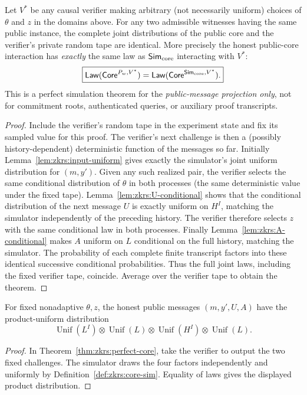 \begin{theorem}\label{thm:zkrs:perfect-core}
Let $V^*$ be any causal verifier making arbitrary (not necessarily
uniform) choices of $\theta$ and $z$ in the domains above.
For any two admissible witnesses having the same public instance,
the complete joint distributions of the public core and
the verifier's private random tape are identical.
More precisely the honest public-core interaction has
\emph{exactly} the same law as
$\mathsf{Sim}_{\rm core}$ interacting with $V^*$:
\[
 \boxed{
 \mathsf{Law}(\mathsf{Core}^{P_w,V^*})
 =\mathsf{Law}(\mathsf{Core}^{\mathsf{Sim}_{\rm core},V^*}).
 }
\]
This is a perfect simulation theorem for the \emph{public-message
projection only}, not for commitment roots, authenticated queries,
or auxiliary proof transcripts.
\end{theorem}
\begin{proof}
Include the verifier's random tape in the experiment state
and fix its sampled value for this proof.
The verifier's next challenge is then a (possibly
history-dependent) deterministic function of the messages so far.
Initially Lemma~\ref{lem:zkrs:input-uniform} gives exactly the
simulator's joint uniform distribution for $(m,y')$.
Given any such realized pair, the verifier selects the same
conditional distribution of $\theta$ in both processes
(the same deterministic value under the fixed tape).
Lemma~\ref{lem:zkrs:U-conditional} shows that the conditional
distribution of the next message $U$ is exactly uniform on $H^I$,
matching the simulator independently of the preceding history.
The verifier therefore selects $z$ with the same conditional
law in both processes. Finally
Lemma~\ref{lem:zkrs:A-conditional} makes $A$ uniform on $L$
conditional on the full history, matching the simulator.
The probability of each complete finite transcript factors into
these identical successive conditional probabilities.
Thus the full joint laws, including the fixed verifier tape,
coincide. Average over the verifier tape to obtain the theorem.
\end{proof}

\begin{corollary}\label{cor:zkrs:product}
For fixed nonadaptive $\theta,z$, the honest public messages
$(m,y',U,A)$ have the product-uniform distribution
\[
 \boxed{\operatorname{Unif}(L^I)\otimes
 \operatorname{Unif}(L)\otimes
 \operatorname{Unif}(H^I)\otimes
 \operatorname{Unif}(L).}
\]
\end{corollary}
\begin{proof}
In Theorem~\ref{thm:zkrs:perfect-core}, take the verifier
to output the two fixed challenges.
The simulator draws the four factors independently
and uniformly by Definition~\ref{def:zkrs:core-sim}.
Equality of laws gives the displayed product distribution.
\end{proof}

